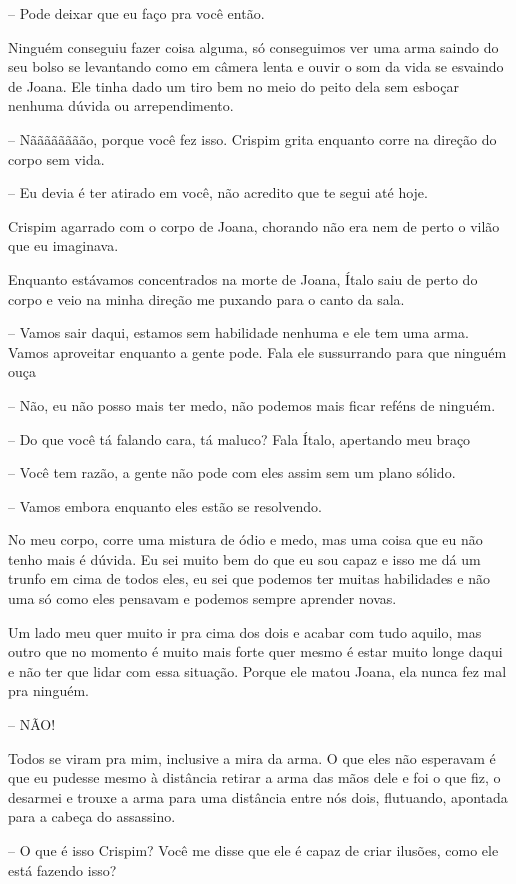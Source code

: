 -- Pode deixar que eu faço pra você então.

Ninguém conseguiu fazer coisa alguma, só conseguimos ver uma arma saindo do seu bolso se levantando como em câmera lenta e ouvir o som da vida se esvaindo de Joana. Ele tinha dado um tiro bem no meio do peito dela sem esboçar nenhuma dúvida ou arrependimento.

-- Nãããããããão, porque você fez isso. Crispim grita enquanto corre na direção do corpo sem vida.

-- Eu devia é ter atirado em você, não acredito que te segui até hoje.

Crispim agarrado com o corpo de Joana, chorando não era nem de perto o vilão que eu imaginava.

Enquanto estávamos concentrados na morte de Joana, Ítalo saiu de perto do corpo e veio na minha direção me puxando para o canto da sala. 

-- Vamos sair daqui, estamos sem habilidade nenhuma e ele tem uma arma. Vamos aproveitar enquanto a gente pode. Fala ele sussurrando para que ninguém ouça

-- Não, eu não posso mais ter medo, não podemos mais ficar reféns de ninguém. 

-- Do que você tá falando cara, tá maluco? Fala Ítalo, apertando meu braço

-- Você tem razão, a gente não pode com eles assim sem um plano sólido.

-- Vamos embora enquanto eles estão se resolvendo.

No meu corpo, corre uma mistura de ódio e medo, mas uma coisa que eu não tenho mais é dúvida. Eu sei muito bem do que eu sou capaz e isso me dá um trunfo em cima de todos eles, eu sei que podemos ter muitas habilidades e não uma só como eles pensavam e podemos sempre aprender novas.

Um lado meu quer muito ir pra cima dos dois e acabar com tudo aquilo, mas outro que no momento é muito mais forte quer mesmo é estar muito longe daqui e não ter que lidar com essa situação. Porque ele matou Joana, ela nunca fez mal pra ninguém.

-- NÃO!

Todos se viram pra mim, inclusive a mira da arma. O que eles não esperavam é que eu pudesse mesmo à distância retirar a arma das mãos dele e foi o que fiz, o desarmei e trouxe a arma para uma distância entre nós dois, flutuando, apontada para a cabeça do assassino.

-- O que é isso Crispim? Você me disse que ele é capaz de criar ilusões, como ele está fazendo isso?

